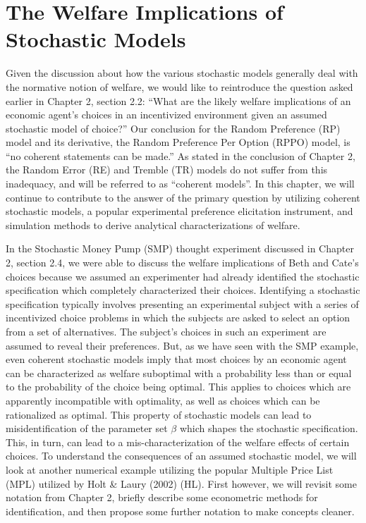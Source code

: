 \documentclass[../main.tex]{subfiles}
\begin{document}
\onehalfspacing
\setcounter{chapter}{2}

\chapter{The Welfare Implications of Stochastic Models}

\lltoc %

Given the discussion about how the various stochastic models generally deal with the normative notion of welfare, we would like to reintroduce the question asked earlier in Chapter 2, section 2.2: 
\enquote{What are the likely welfare implications of an economic agent's choices in an incentivized environment given an assumed stochastic model of choice?}
Our conclusion for the Random Preference (RP) model and its derivative, the Random Preference Per Option (RPPO) model, is \enquote{no coherent statements can be made.}
As stated in the conclusion of Chapter 2, the Random Error (RE) and Tremble (TR) models do not suffer from this inadequacy, and will be referred to as \enquote{coherent models}. 
In this chapter, we will continue to contribute to the answer of the primary question by utilizing coherent stochastic models, a popular experimental preference elicitation instrument, and simulation methods to derive analytical characterizations of welfare.

In the Stochastic Money Pump (SMP) thought experiment discussed in Chapter 2, section 2.4, we were able to discuss the welfare implications of Beth and Cate's choices because we assumed an experimenter had already identified the stochastic specification which completely characterized their choices.
Identifying a stochastic specification typically involves presenting an experimental subject with a series of incentivized choice problems in which the subjects are asked to select an option from a set of alternatives.
The subject's choices in such an experiment are assumed to reveal their preferences.
But, as we have seen with the SMP example, even coherent stochastic models imply that most choices by an economic agent can be characterized as welfare suboptimal with a probability less than or equal to the probability of the choice being optimal.
This applies to choices which are apparently incompatible with optimality, as well as choices which can be rationalized as optimal.
This property of stochastic models can lead to misidentification of the parameter set $\beta$ which shapes the stochastic specification.
This, in turn, can lead to a mis-characterization of the welfare effects of certain choices.
To understand the consequences of an assumed stochastic model, we will look at another numerical example utilizing the popular Multiple Price List (MPL) utilized by Holt \& Laury (2002) (HL).
First however, we will revisit some notation from Chapter 2, briefly describe some econometric methods for identification, and then propose some further notation to make concepts cleaner.
\end{document}
